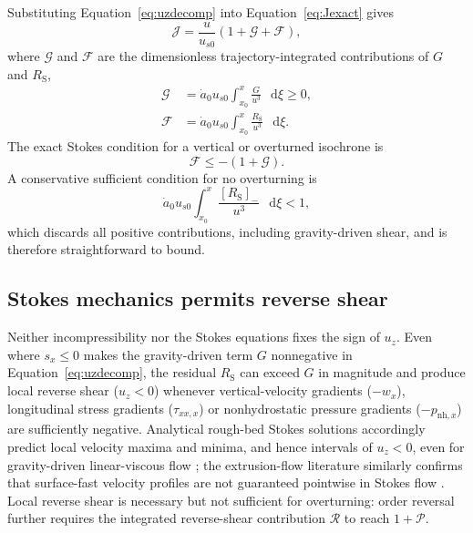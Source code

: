 \documentclass[review]{igs}
\begin{document}
Substituting Equation~\ref{eq:uzdecomp} into Equation~\ref{eq:Jexact} gives
\begin{equation}
\mathcal{J}=\frac{u}{u_{s0}}
\left(1+\mathcal{G}+\mathcal{F}\right),
\label{eq:Jfullstokes}
\end{equation}
where \(\mathcal{G}\) and \(\mathcal{F}\) are the dimensionless trajectory-integrated contributions of \(G\) and \(R_{\mathrm{S}}\),
\begin{align}
\mathcal{G}&=\dot a_0u_{s0}
\int_{x_0}^{x}\frac{G}{u^3}\,\mathop{}\!\mathrm{d}\xi\geq0,
\label{eq:Ggrav}\\
\mathcal{F}&=\dot a_0u_{s0}
\int_{x_0}^{x}\frac{R_{\mathrm{S}}}{u^3}\,\mathop{}\!\mathrm{d}\xi.
\label{eq:Gfs}
\end{align}
The exact Stokes condition for a vertical or overturned isochrone is
\begin{equation}
\mathcal{F}\leq-\left(1+\mathcal{G}\right).
\label{eq:FSfailure}
\end{equation}
A conservative sufficient condition for no overturning is
\begin{equation}
\dot a_0u_{s0}
\int_{x_0}^{x}
\frac{\left[R_{\mathrm{S}}\right]_{-}}{u^3}\,\mathop{}\!\mathrm{d}\xi<1,
\label{eq:FSsufficient}
\end{equation}
which discards all positive contributions, including gravity-driven shear, and is therefore straightforward to bound.

\subsection{Stokes mechanics permits reverse shear}

Neither incompressibility nor the Stokes equations fixes the sign of \(u_z\). Even where \(s_x\leq0\) makes the gravity-driven term \(G\) nonnegative in Equation~\ref{eq:uzdecomp}, the residual \(R_{\mathrm{S}}\) can exceed \(G\) in magnitude and produce local reverse shear (\(u_z<0\)) whenever vertical-velocity gradients (\(-w_x\)), longitudinal stress gradients (\(\tau_{xx,x}\)) or nonhydrostatic pressure gradients (\(-p_{\mathrm{nh},x}\)) are sufficiently negative. Analytical rough-bed Stokes solutions accordingly predict local velocity maxima and minima, and hence intervals of \(u_z<0\), even for gravity-driven linear-viscous flow \citep{Gudmundsson1997linear}; the extrusion-flow literature similarly confirms that surface-fast velocity profiles are not guaranteed pointwise in Stokes flow \citep{Waddington2010}. Local reverse shear is necessary but not sufficient for overturning: order reversal further requires the integrated reverse-shear contribution \(\mathcal{R}\) to reach \(1+\mathcal{P}\).
\end{document}
